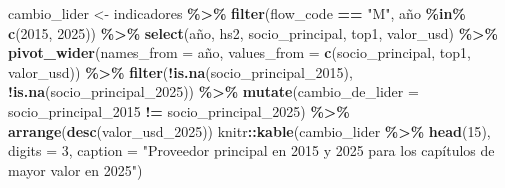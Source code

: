 \documentclass[
]{article}
\newenvironment{Shaded}{\begin{snugshade}}{\end{snugshade}}
\newcommand{\AttributeTok}[1]{\textcolor[rgb]{0.13,0.29,0.53}{#1}}
\newcommand{\DecValTok}[1]{\textcolor[rgb]{0.00,0.00,0.81}{#1}}
\newcommand{\FunctionTok}[1]{\textcolor[rgb]{0.13,0.29,0.53}{\textbf{#1}}}
\newcommand{\NormalTok}[1]{#1}
\newcommand{\OtherTok}[1]{\textcolor[rgb]{0.56,0.35,0.01}{#1}}
\newcommand{\SpecialCharTok}[1]{\textcolor[rgb]{0.81,0.36,0.00}{\textbf{#1}}}
\newcommand{\StringTok}[1]{\textcolor[rgb]{0.31,0.60,0.02}{#1}}
\begin{document}
\begin{Shaded}
\begin{Highlighting}[]
\NormalTok{cambio\_lider }\OtherTok{\textless{}{-}}\NormalTok{ indicadores }\SpecialCharTok{\%\textgreater{}\%}
  \FunctionTok{filter}\NormalTok{(flow\_code }\SpecialCharTok{==} \StringTok{"M"}\NormalTok{, año }\SpecialCharTok{\%in\%} \FunctionTok{c}\NormalTok{(}\DecValTok{2015}\NormalTok{, }\DecValTok{2025}\NormalTok{)) }\SpecialCharTok{\%\textgreater{}\%}
  \FunctionTok{select}\NormalTok{(año, hs2, socio\_principal, top1, valor\_usd) }\SpecialCharTok{\%\textgreater{}\%}
  \FunctionTok{pivot\_wider}\NormalTok{(}\AttributeTok{names\_from =}\NormalTok{ año,}
              \AttributeTok{values\_from =} \FunctionTok{c}\NormalTok{(socio\_principal, top1, valor\_usd)) }\SpecialCharTok{\%\textgreater{}\%}
  \FunctionTok{filter}\NormalTok{(}\SpecialCharTok{!}\FunctionTok{is.na}\NormalTok{(socio\_principal\_2015), }\SpecialCharTok{!}\FunctionTok{is.na}\NormalTok{(socio\_principal\_2025)) }\SpecialCharTok{\%\textgreater{}\%}
  \FunctionTok{mutate}\NormalTok{(}\AttributeTok{cambio\_de\_lider =}\NormalTok{ socio\_principal\_2015 }\SpecialCharTok{!=}\NormalTok{ socio\_principal\_2025) }\SpecialCharTok{\%\textgreater{}\%}
  \FunctionTok{arrange}\NormalTok{(}\FunctionTok{desc}\NormalTok{(valor\_usd\_2025))}
\NormalTok{knitr}\SpecialCharTok{::}\FunctionTok{kable}\NormalTok{(cambio\_lider }\SpecialCharTok{\%\textgreater{}\%} \FunctionTok{head}\NormalTok{(}\DecValTok{15}\NormalTok{), }\AttributeTok{digits =} \DecValTok{3}\NormalTok{,}
             \AttributeTok{caption =} \StringTok{"Proveedor principal en 2015 y 2025 para los capítulos de mayor valor en 2025"}\NormalTok{)}
\end{Highlighting}
\end{Shaded}
\end{document}
